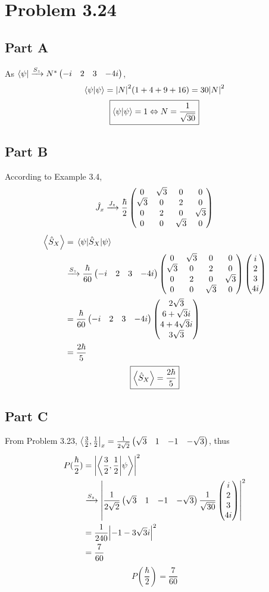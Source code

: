 \documentclass{article}
\begin{document}
\section*{Problem 3.24}
\subsection*{Part A}
As $\bra{\psi} \xrightarrow{S_z} N^*\pmqty{-i&2&3&-4i}$,
\[
    \braket{\psi} = \abs{N}^2(1+4+9+16) = 30\abs{N}^2
\]
\[\boxed{
    \braket{\psi} = 1
    \Leftrightarrow
    N = \frac{1}{\sqrt{30}}}
\]
\subsection*{Part B}
According to Example 3.4,
\[
    \hat{J}_x 
    \xrightarrow{J_z}
    \frac{\hbar}{2} \pmqty{0 & \sqrt{3} & 0 & 0 \\ \sqrt{3} & 0 & 2 & 0 \\ 0 & 2 & 0 & \sqrt{3} \\ 0 & 0 & \sqrt{3} & 0}
\]
\[
    \begin{split}
        \expval{\hat{S}_X}
        &= \expval{\hat{S}_X}{\psi} \\
        &\xrightarrow{S_z}
        \frac{\hbar}{60} \pmqty{-i&2&3&-4i} 
        \pmqty{0 & \sqrt{3} & 0 & 0 \\ \sqrt{3} & 0 & 2 & 0 \\ 0 & 2 & 0 & \sqrt{3} \\ 0 & 0 & \sqrt{3} & 0}
        \pmqty{i \\ 2 \\3 \\4i} \\
        &= \frac{\hbar}{60} \pmqty{-i&2&3&-4i}  
        \pmqty{2\sqrt{3} \\ 6+\sqrt{3}i \\ 4+4\sqrt{3}i \\ 3\sqrt{3}} \\
        &= \frac{2\hbar}{5}
    \end{split}
\]
\[
    \boxed{
        \expval{\hat{S}_X}= \frac{2\hbar}{5}
    }
\]
\subsection*{Part C}
From Problem 3.23, $\bra{\frac{3}{2}, \frac{1}{2}}_x =\frac{1}{2\sqrt{2}}\pmqty{\sqrt{3}&1&-1&-\sqrt{3}}$, thus
\[
    \begin{split}
        P(\frac{\hbar}{2}) &=
        \abs{\braket{\frac{3}{2},\frac{1}{2}}{\psi}}^2 \\
        &\xrightarrow{S_z}
        \abs{\frac{1}{2\sqrt{2}}\pmqty{\sqrt{3}&1&-1&-\sqrt{3}}\frac{1}{\sqrt{30}}\pmqty{i\\2\\3\\4i}}^2 \\
        &=\frac{1}{240} \abs{-1-3\sqrt{3}i}^2 \\
        &=\frac{7}{60}
    \end{split}
\]
\[
    \boxed{P(\frac{\hbar}{2})=\frac{7}{60}}
\]
\end{document}
